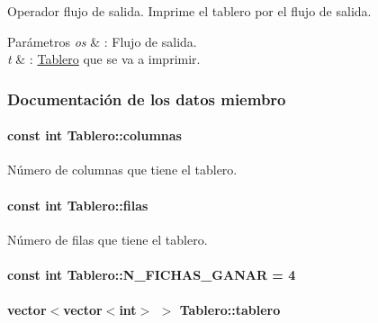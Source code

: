 Operador flujo de salida. Imprime el tablero por el flujo de salida. 


\begin{DoxyParams}{Parámetros}
{\em os} & \-: Flujo de salida. \\
\hline
{\em t} & \-: \hyperlink{classTablero}{Tablero} que se va a imprimir. \\
\hline
\end{DoxyParams}


\subsubsection{Documentación de los datos miembro}
\hypertarget{classTablero_ac70289ec91b44d05da648770cc46801d}{
\paragraph[{columnas}]{\setlength{\rightskip}{0pt plus 5cm}const int Tablero\-::columnas\hspace{0.3cm}{\ttfamily [private]}}}\label{classTablero_ac70289ec91b44d05da648770cc46801d}


Número de columnas que tiene el tablero. 

\hypertarget{classTablero_a6b1f04a8502106c33bf5469f791320e6}{
\paragraph[{filas}]{\setlength{\rightskip}{0pt plus 5cm}const int Tablero\-::filas\hspace{0.3cm}{\ttfamily [private]}}}\label{classTablero_a6b1f04a8502106c33bf5469f791320e6}


Número de filas que tiene el tablero. 

\hypertarget{classTablero_aa38ed353bef45bd6c5a2e3aa4a897720}{
\paragraph[{N\-\_\-\-F\-I\-C\-H\-A\-S\-\_\-\-G\-A\-N\-A\-R}]{\setlength{\rightskip}{0pt plus 5cm}const int Tablero\-::\-N\-\_\-\-F\-I\-C\-H\-A\-S\-\_\-\-G\-A\-N\-A\-R = 4\hspace{0.3cm}{\ttfamily [static]}}}\label{classTablero_aa38ed353bef45bd6c5a2e3aa4a897720}
\hypertarget{classTablero_a5df607d108c0c0a14aa4f393b7f43030}{
\paragraph[{tablero}]{\setlength{\rightskip}{0pt plus 5cm}vector$<$vector$<$int$>$ $>$ Tablero\-::tablero\hspace{0.3cm}{\ttfamily [private]}}}\label{classTablero_a5df607d108c0c0a14aa4f393b7f43030}


